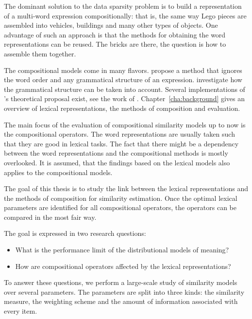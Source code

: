 The dominant solution to the data sparsity problem is to build a representation of a multi-word expression compositionally: that is, the same way Lego pieces are assembled into vehicles, buildings and many other types of objects. One advantage of such an approach is that the methods for obtaining the word representations can be reused. The bricks are there, the question is how to assemble them together.

The compositional models come in many flavors. \citet{mitchell2010composition} propose a method that ignores the word order and any grammatical structure of an expression. \citet{DBLP:journals/corr/abs-1003-4394,baroni2014frege} investigate how the grammatical structure can be taken into account. Several implementations of \citet{DBLP:journals/corr/abs-1003-4394}'s theoretical proposal exist, see the work of \citet{Grefenstette:2011:ESC:2145432.2145580,Grefenstette:2011:ETV:2140490.2140497,kartsadrqpl2014,fried-polajnar-clark:2015:ACL-IJCNLP}. Chapter~\ref{cha:background} gives an overview of lexical representations, the methods of composition and evaluation.

The main focus of the evaluation of compositional similarity models up to now is the compositional operators. The word representations are usually taken such that they are good in lexical tasks. The fact that there might be a dependency between the word representations and the compositional methods is mostly overlooked. It is assumed, that the findings based on the lexical models also applies to the compositional models.

The goal of this thesis is to study the link between the lexical representations and the methods of composition for similarity estimation. Once the optimal lexical parameters are identified for all compositional operators, the operators can be compared in the most fair way.

The goal is expressed in two research questions:
\begin{itemize}
\item What is the performance limit of the distributional models of meaning?
\item How are compositional operators affected by the lexical representations?
\end{itemize}

To answer these questions, we perform a large-scale study of similarity models over several parameters. The parameters are split into three kinds: the similarity measure, the weighting scheme and the amount of information associated with every item. 

